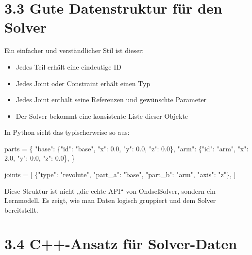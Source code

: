 \documentclass[
  12pt
]{book}
\newenvironment{Shaded}{}{}
\newcommand{\FloatTok}[1]{\textcolor[rgb]{0.25,0.63,0.44}{#1}}
\newcommand{\NormalTok}[1]{#1}
\newcommand{\OperatorTok}[1]{\textcolor[rgb]{0.40,0.40,0.40}{#1}}
\newcommand{\StringTok}[1]{\textcolor[rgb]{0.25,0.44,0.63}{#1}}
\providecommand{\tightlist}{%
  \setlength{\itemsep}{0pt}\setlength{\parskip}{0pt}}
\begin{document}
\hypertarget{gute-datenstruktur-fuxfcr-den-solver}{%
\section{\texorpdfstring{{3.3} Gute Datenstruktur für den
Solver}{3.3 Gute Datenstruktur für den Solver}}\label{gute-datenstruktur-fuxfcr-den-solver}}

Ein einfacher und verständlicher Stil ist dieser:

\begin{itemize}
\tightlist
\item
  Jedes Teil erhält eine eindeutige ID
\item
  Jedes Joint oder Constraint erhält einen Typ
\item
  Jedes Joint enthält seine Referenzen und gewünschte Parameter
\item
  Der Solver bekommt eine konsistente Liste dieser Objekte
\end{itemize}

In Python sieht das typischerweise so aus:

\begin{Shaded}
\begin{Highlighting}[]
\NormalTok{parts }\OperatorTok{=}\NormalTok{ \{}
    \StringTok{"base"}\NormalTok{: \{}\StringTok{"id"}\NormalTok{: }\StringTok{"base"}\NormalTok{, }\StringTok{"x"}\NormalTok{: }\FloatTok{0.0}\NormalTok{, }\StringTok{"y"}\NormalTok{: }\FloatTok{0.0}\NormalTok{, }\StringTok{"z"}\NormalTok{: }\FloatTok{0.0}\NormalTok{\},}
    \StringTok{"arm"}\NormalTok{: \{}\StringTok{"id"}\NormalTok{: }\StringTok{"arm"}\NormalTok{, }\StringTok{"x"}\NormalTok{: }\FloatTok{2.0}\NormalTok{, }\StringTok{"y"}\NormalTok{: }\FloatTok{0.0}\NormalTok{, }\StringTok{"z"}\NormalTok{: }\FloatTok{0.0}\NormalTok{\},}
\NormalTok{\}}

\NormalTok{joints }\OperatorTok{=}\NormalTok{ [}
\NormalTok{    \{}\StringTok{"type"}\NormalTok{: }\StringTok{"revolute"}\NormalTok{, }\StringTok{"part\_a"}\NormalTok{: }\StringTok{"base"}\NormalTok{, }\StringTok{"part\_b"}\NormalTok{: }\StringTok{"arm"}\NormalTok{, }\StringTok{"axis"}\NormalTok{: }\StringTok{"z"}\NormalTok{\},}
\NormalTok{]}
\end{Highlighting}
\end{Shaded}

Diese Struktur ist nicht „die echte API`` von OndselSolver, sondern ein
Lernmodell. Es zeigt, wie man Daten logisch gruppiert und dem Solver
bereitstellt.

\hypertarget{c-ansatz-fuxfcr-solver-daten}{%
\section{\texorpdfstring{{3.4} C++-Ansatz für
Solver-Daten}{3.4 C++-Ansatz für Solver-Daten}}\label{c-ansatz-fuxfcr-solver-daten}}
\end{document}
